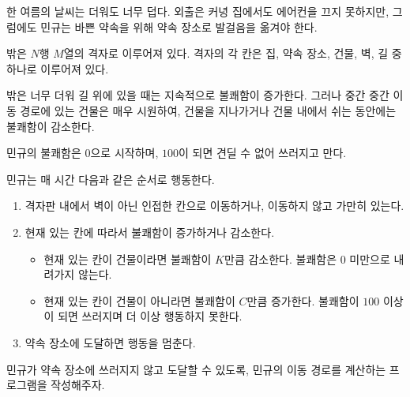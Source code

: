 한 여름의 날씨는 더워도 너무 덥다. 외출은 커녕 집에서도 에어컨을 끄지 못하지만, 그럼에도 민규는 바쁜 약속을 위해 약속 장소로 발걸음을 옮겨야 한다. 

밖은 $N$행 $M$열의 격자로 이루어져 있다. 격자의 각 칸은 집, 약속 장소, 건물, 벽, 길 중 하나로 이루어져 있다.

밖은 너무 더워 길 위에 있을 때는 지속적으로 불쾌함이 증가한다. 그러나 중간 중간 이동 경로에 있는 건물은 매우 시원하여, 건물을 지나가거나 건물 내에서 쉬는 동안에는 불쾌함이 감소한다.

민규의 불쾌함은 $0$으로 시작하며, $100$이 되면 견딜 수 없어 쓰러지고 만다.

민규는 매 시간 다음과 같은 순서로 행동한다. 

\begin{enumerate}
  \item 격자판 내에서 벽이 아닌 인접한 칸으로 이동하거나, 이동하지 않고 가만히 있는다.

  \item 현재 있는 칸에 따라서 불쾌함이 증가하거나 감소한다.
  \begin{itemize}
    \item 현재 있는 칸이 건물이라면 불쾌함이 $K$만큼 감소한다. 불쾌함은 $0$ 미만으로 내려가지 않는다.
    \item 현재 있는 칸이 건물이 아니라면 불쾌함이 $C$만큼 증가한다. 불쾌함이 $100$ 이상이 되면 쓰러지며 더 이상 행동하지 못한다.
  \end{itemize}

  \item 약속 장소에 도달하면 행동을 멈춘다.
\end{enumerate}

민규가 약속 장소에 쓰러지지 않고 도달할 수 있도록, 민규의 이동 경로를 계산하는 프로그램을 작성해주자.
